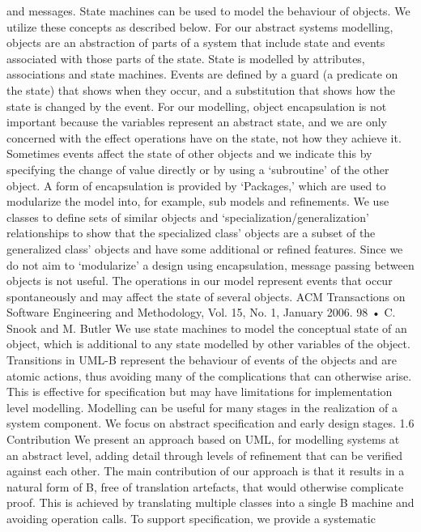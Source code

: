 and messages. State machines can be used to model the behaviour of objects.
We utilize these concepts as described below.
For our abstract systems modelling, objects are an abstraction of parts of a
system that include state and events associated with those parts of the state.
State is modelled by attributes, associations and state machines. Events are
defined by a guard (a predicate on the state) that shows when they occur, and
a substitution that shows how the state is changed by the event. For our modelling, object encapsulation is not important because the variables represent
an abstract state, and we are only concerned with the effect operations have on
the state, not how they achieve it. Sometimes events affect the state of other
objects and we indicate this by specifying the change of value directly or by
using a ‘subroutine’ of the other object. A form of encapsulation is provided
by ‘Packages,’ which are used to modularize the model into, for example, sub
models and refinements. We use classes to define sets of similar objects and
‘specialization/generalization’ relationships to show that the specialized class’
objects are a subset of the generalized class’ objects and have some additional
or refined features.
Since we do not aim to ‘modularize’ a design using encapsulation, message passing between objects is not useful. The operations in our model represent events that occur spontaneously and may affect the state of several
objects.
ACM Transactions on Software Engineering and Methodology, Vol. 15, No. 1, January 2006.
98 • C. Snook and M. Butler
We use state machines to model the conceptual state of an object, which is
additional to any state modelled by other variables of the object. Transitions
in UML-B represent the behaviour of events of the objects and are atomic actions, thus avoiding many of the complications that can otherwise arise. This
is effective for specification but may have limitations for implementation level
modelling.
Modelling can be useful for many stages in the realization of a system component. We focus on abstract specification and early design stages.
1.6 Contribution
We present an approach based on UML, for modelling systems at an abstract
level, adding detail through levels of refinement that can be verified against
each other. The main contribution of our approach is that it results in a natural form of B, free of translation artefacts, that would otherwise complicate
proof. This is achieved by translating multiple classes into a single B machine
and avoiding operation calls. To support specification, we provide a systematic
